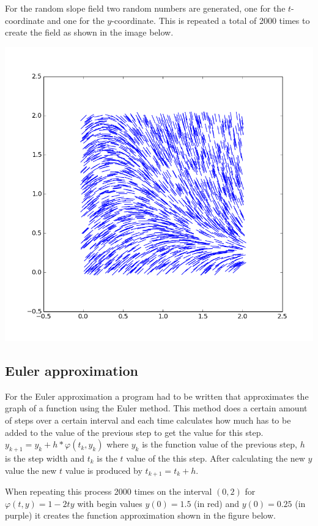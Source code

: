 \documentclass[a4paper,12px]{article}
\begin{document}
For the random slope field two random numbers are generated, one for the
$t$-coordinate and one for the $y$-coordinate. This is repeated a total of 2000
times to create the field as shown in the image below.
\begin{center}
    \includegraphics[width=\textwidth]{randomfield}
\end{center}

\subsection{Euler approximation}

For the Euler approximation a program had to be written that approximates the
graph of a function using the Euler method. This method does a certain amount of
steps over a certain interval and each time calculates how much has to be added
to the value of the previous step to get the value for this step.
$y_{k+1}=y_k+h*\varphi (t_k,y_k)$ where $y_k$ is the function value of the
previous step, $h$ is the step width and $t_k$ is the $t$ value of the  this
step. After calculating the new $y$ value the new $t$ value is produced by
$t_{k+1} = t_k + h$.

When repeating this process 2000 times on the interval $(0,2)$ for $\varphi(t,
y) = 1-2ty$ with begin values $y(0) = 1.5$ (in red) and $y(0) = 0.25$ (in
purple) it creates the function approximation shown in the figure below.
\end{document}
